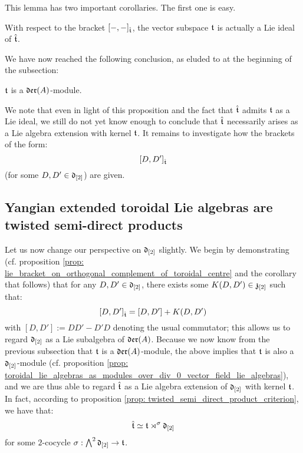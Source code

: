         This lemma has two important corollaries. The first one is easy.
        \begin{corollary}
            With respect to the bracket $[-, -]_{\hat{\mathfrak{t}}}$, the vector subspace $\mathfrak{t}$ is actually a Lie ideal of $\hat{\mathfrak{t}}$.
        \end{corollary}

        We have now reached the following conclusion, as eluded to at the beginning of the subsection:
        \begin{proposition} \label{prop: toroidal_lie_algebras_as_modules_over_vector_field_lie_algebras}
            $\mathfrak{t}$ is a $\mathfrak{der}(A)$-module.
        \end{proposition}
        We note that even in light of this proposition and the fact that $\hat{\mathfrak{t}}$ admits $\mathfrak{t}$ as a Lie ideal, we still do not yet know enough to conclude that $\hat{\mathfrak{t}}$ necessarily arises as a Lie algebra extension with kernel $\mathfrak{t}$. It remains to investigate how the brackets of the form:
            $$[D, D']_{\hat{\mathfrak{t}}}$$
        (for some $D, D' \in \mathfrak{d}_{[2]}$) are given.

    \subsection{Yangian extended toroidal Lie algebras are twisted semi-direct products}
        Let us now change our perspective on $\mathfrak{d}_{[2]}$ slightly. We begin by demonstrating (cf. proposition \ref{prop: lie_bracket_on_orthogonal_complement_of_toroidal_centre} and the corollary that follows) that for any $D, D' \in \mathfrak{d}_{[2]}$, there exists some $K(D, D') \in \mathfrak{z}_{[2]}$ such that:
            $$[D, D']_{\hat{\mathfrak{t}}} = [D, D'] + K(D, D')$$
        with $[D, D'] := DD' - D'D$ denoting the usual commutator; this allows us to regard $\mathfrak{d}_{[2]}$ as a Lie subalgebra of $\mathfrak{der}(A)$. Because we now know from the previous subsection that $\mathfrak{t}$ is a $\mathfrak{der}(A)$-module, the above implies that $\mathfrak{t}$ is also a $\mathfrak{d}_{[2]}$-module (cf. proposition \ref{prop: toroidal_lie_algebras_as_modules_over_div_0_vector_field_lie_algebras}), and we are thus able to regard $\hat{\mathfrak{t}}$ as a Lie algebra extension of $\mathfrak{d}_{[2]}$ with kernel $\mathfrak{t}$. In fact, according to proposition \ref{prop: twisted_semi_direct_product_criterion}, we have that:
            $$\hat{\mathfrak{t}} \simeq \mathfrak{t} \rtimes^{\sigma} \mathfrak{d}_{[2]}$$
        for some $2$-cocycle $\sigma: \bigwedge^2 \mathfrak{d}_{[2]} \to \mathfrak{t}$.
        
